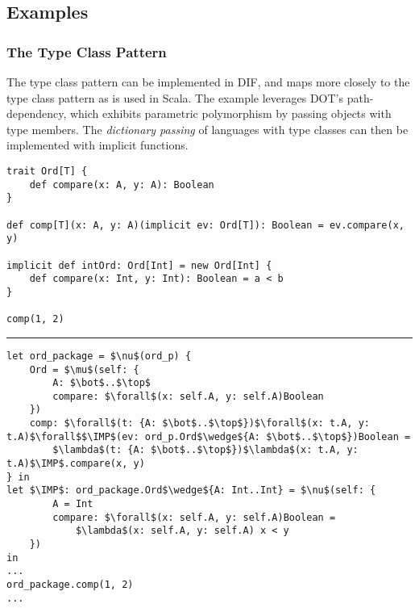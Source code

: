 \subsection{Examples}

\subsubsection{The Type Class Pattern}

The type class pattern \cite{OBLB18} can be implemented in DIF, and maps more
closely to the type class pattern as is used in Scala. The example leverages
DOT's path-dependency, which exhibits parametric polymorphism by passing
objects with type members. The \emph{dictionary passing} \cite{K88, WB89} of
languages with type classes can then be implemented with implicit functions.

\begin{minipage}{\textwidth}
\begin{lstlisting}[mathescape]
trait Ord[T] {
    def compare(x: A, y: A): Boolean
}

def comp[T](x: A, y: A)(implicit ev: Ord[T]): Boolean = ev.compare(x, y)

implicit def intOrd: Ord[Int] = new Ord[Int] {
    def compare(x: Int, y: Int): Boolean = a < b
}

comp(1, 2)
\end{lstlisting}
\end{minipage}

\vspace{2mm}
\hrule

\begin{minipage}{\textwidth}
\begin{lstlisting}[mathescape]
let ord_package = $\nu$(ord_p) {
    Ord = $\mu$(self: {
        A: $\bot$..$\top$
        compare: $\forall$(x: self.A, y: self.A)Boolean
    })
    comp: $\forall$(t: {A: $\bot$..$\top$})$\forall$(x: t.A, y: t.A)$\forall$$\IMP$(ev: ord_p.Ord$\wedge${A: $\bot$..$\top$})Boolean =
        $\lambda$(t: {A: $\bot$..$\top$})$\lambda$(x: t.A, y: t.A)$\IMP$.compare(x, y)
} in
let $\IMP$: ord_package.Ord$\wedge${A: Int..Int} = $\nu$(self: {
        A = Int
        compare: $\forall$(x: self.A, y: self.A)Boolean =
            $\lambda$(x: self.A, y: self.A) x < y
    })
in
...
ord_package.comp(1, 2)
...
\end{lstlisting}
\end{minipage}
